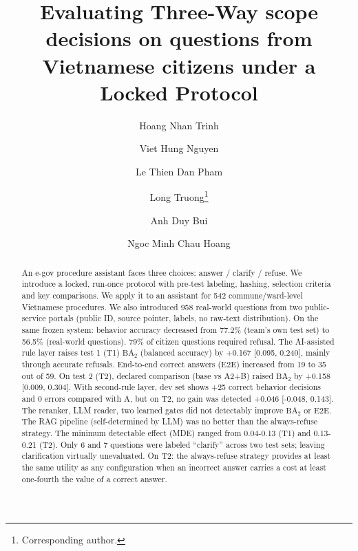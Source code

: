 \documentclass[runningheads]{llncs}
\newcommand{\BA}{\ensuremath{\mathrm{BA}_2}}
\begin{document}
\title{Evaluating Three-Way scope decisions on questions from Vietnamese citizens under a Locked Protocol}

\author{Hoang Nhan Trinh \and
Viet Hung Nguyen \and
Le Thien Dan Pham \and
Long Truong\thanks{Corresponding author.} \and
Anh Duy Bui \and
Ngoc Minh Chau Hoang}



\maketitle

\begin{abstract}

{An e-gov procedure assistant faces three choices: answer / clarify / refuse. We introduce a locked, run-once protocol with pre-test labeling, hashing, selection criteria and key comparisons. We apply it to an assistant for 542 commune/ward-level Vietnamese procedures. We also introduced 958 real-world questions from two public-service portals (public ID, source pointer, labels, no raw-text distribution). On the same frozen system: behavior accuracy decreased from 77.2\% (team's own test set) to 56.5\% (real-world questions). 79\% of citizen questions required refusal. The AI-assisted rule layer raises test 1 (T1) \BA{} (balanced
accuracy) by +0.167 [0.095, 0.240], mainly through accurate refusals.  End-to-end correct answers (E2E) increased from 19 to 35 out of 59. On test 2 (T2), declared comparison (base vs A2+B) raised \BA{} by +0.158 [0.009, 0.304]. With second-rule layer, dev set shows +25 correct behavior decisions and 0 errors compared with A, but on T2, no gain was detected +0.046 [-0.048, 0.143]. The reranker, LLM reader, two learned gates did not detectably improve \BA{} or E2E. The RAG pipeline (self-determined by LLM) was no better than the always-refuse strategy. The minimum detectable effect (MDE) ranged from 0.04-0.13 (T1) and 0.13-0.21 (T2). Only 6 and 7 questions were labeled ``clarify'' across two test sets; leaving clarification virtually unevaluated. On T2: the always-refuse strategy provides at least the same utility as any configuration when an incorrect answer carries a cost at least one-fourth the value of a correct answer.}

\end{abstract}
\end{document}
